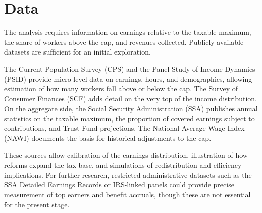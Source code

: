 \section*{Data}

The analysis requires information on earnings relative to the taxable maximum, the share of workers above the cap, and revenues collected. Publicly available datasets are sufficient for an initial exploration.  

The Current Population Survey (CPS) and the Panel Study of Income Dynamics (PSID) provide micro-level data on earnings, hours, and demographics, allowing estimation of how many workers fall above or below the cap. The Survey of Consumer Finances (SCF) adds detail on the very top of the income distribution. On the aggregate side, the Social Security Administration (SSA) publishes annual statistics on the taxable maximum, the proportion of covered earnings subject to contributions, and Trust Fund projections. The National Average Wage Index (NAWI) documents the basis for historical adjustments to the cap.  

These sources allow calibration of the earnings distribution, illustration of how reforms expand the tax base, and simulations of redistribution and efficiency implications. For further research, restricted administrative datasets such as the SSA Detailed Earnings Records or IRS-linked panels could provide precise measurement of top earners and benefit accruals, though these are not essential for the present stage.  


\newpage






